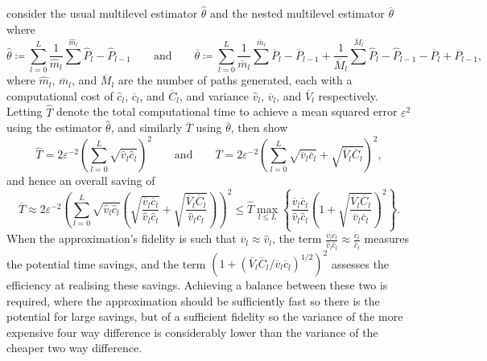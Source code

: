 \documentclass[manuscript,review]{acmart}
\begin{document}
\citet{giles2020approximating} consider the usual multilevel estimator $ \hat{\theta} $ and the nested multilevel estimator $ \overline{\theta} $ where
\begin{equation*}
\hat{\theta}  \coloneqq \sum_{l=0}^{L} \dfrac{1}{\widehat{m}_l} \sum^{\widehat{m}_l} \widehat{P}_l - \widehat{P}_{l-1}
\qquad \text{and} \qquad
\overline{\theta} \coloneqq \sum_{l=0}^L \dfrac{1}{\overline{m}_l} \sum^{\overline{m}_l} \overline{P}_l - \overline{P}_{l-1} + \dfrac{1}{\overline{M}_l} \sum^{\overline{M}_l} \widehat{P}_l - \widehat{P}_{l-1} - \overline{P}_l + \overline{P}_{l-1},
\end{equation*}
where $ \widehat{m}_l $, $ \overline{m}_l $, and $ \overline{M}_l $ are the number of paths generated, each with a computational cost of $ \hat{c}_l $, $ \overline{c}_l $, and $ \overline{C}_l $, and variance $ \hat{v}_l $, $ \overline{v}_l $, and $ \overline{V}_l $ respectively. Letting $ \widehat{T} $ denote the total computational time to achieve a mean squared error $ \varepsilon^2 $ using the estimator $ \hat{\theta} $, and similarly $ \overline{T} $ using $ \overline{\theta} $, then \citet{giles2020approximating} show
\begin{equation*}
\widehat{T} = 2\varepsilon^{-2}\left(\sum_{l=0}^L \sqrt{\hat{v}_l \hat{c}_l}\right)^2 
\qquad \text{and} \qquad 
\overline{T} = 2\varepsilon^{-2} \left(\sum_{l=0}^L \sqrt{\overline{v}_l \overline{c}_l} + \sqrt{\overline{V}_l \overline{C}_l}\right)^2,
\end{equation*}
and hence an overall saving of
\begin{equation*}
\overline{T} 
\approx 2\varepsilon^{-2} \left(\sum_{l=0}^L \sqrt{\hat{v}_l \hat{c}_l} \left( \sqrt{\dfrac{\overline{v}_l\overline{c}_l}{\hat{v}_l\hat{c}_l}} + \sqrt{\dfrac{\overline{V}_l \overline{C}_l}{\hat{v}_l \hat{c}_l}}\right)\right)^2 
\leq \widehat{T} \max_{l \leq L} \left\{ \dfrac{\overline{v}_l\overline{c}_l}{\hat{v}_l\hat{c}_l} \left(1 + \sqrt{\dfrac{\overline{V}_l \overline{C}_l}{\overline{v}_l \overline{c}_l}}\right)^2\right\}.
\end{equation*}
When the approximation's fidelity is such that $ \overline{v}_l \approx \hat{v}_l $, the term $ \tfrac{\overline{v}_l\overline{c}_l}{\hat{v}_l\hat{c}_l} \approx \tfrac{\overline{c}_l}{\hat{c}_l}$ measures the potential time savings, and the term $ (1 + (\overline{V}_l \overline{C}_l / \overline{v}_l \overline{c}_l)^{1/2})^2 $ assesses the efficiency at realising these savings. Achieving a balance between these two is required, where the approximation should be sufficiently fast so there is the potential for large savings, but of a sufficient fidelity so the variance of the more expensive four way difference is considerably lower than the variance of the cheaper two way difference.
\end{document}
